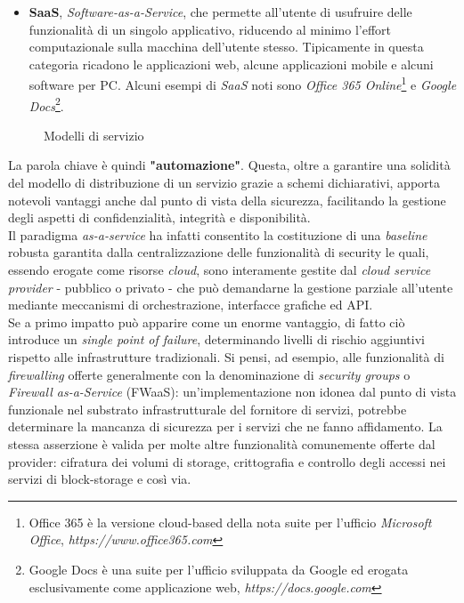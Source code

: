 \documentclass[../main.tex]{subfiles}
\begin{document}
\begin{itemize}
    \item \textbf{SaaS}, \textit{Software-as-a-Service}, che permette all'utente di usufruire delle funzionalità di un singolo applicativo, riducendo al minimo l'effort computazionale sulla macchina dell'utente stesso. Tipicamente in questa categoria ricadono le applicazioni web, alcune applicazioni mobile e alcuni software per PC. Alcuni esempi di \textit{SaaS} noti sono \textit{Office 365 Online}\footnote{Office 365 è la versione cloud-based della nota suite per l'ufficio \textit{Microsoft Office}, \textit{https://www.office365.com}} e \textit{Google Docs}\footnote{Google Docs è una suite per l'ufficio sviluppata da Google ed erogata esclusivamente come applicazione web, \textit{https://docs.google.com}}.
\end{itemize}
\begin{figure}[H]
\centering
{}
\caption{Modelli di servizio}\label{fig:modelliservizio}
\end{figure}




La parola chiave è quindi \textbf{"automazione"}. Questa, oltre a garantire una solidità del modello di distribuzione di un servizio grazie a schemi dichiarativi, apporta notevoli vantaggi anche dal punto di vista della sicurezza, facilitando la gestione degli aspetti di confidenzialità, integrità e disponibilità.
\\Il paradigma \textit{as-a-service} ha infatti consentito la costituzione di una \textit{baseline} robusta garantita dalla centralizzazione delle funzionalità di security le quali, essendo erogate come risorse \textit{cloud}, sono interamente gestite dal \textit{cloud service provider} - pubblico o privato - che può demandarne la gestione parziale all'utente mediante meccanismi di orchestrazione, interfacce grafiche ed API.
\\Se a primo impatto può apparire come un enorme vantaggio, di fatto ciò introduce un \textit{single point of failure}, determinando livelli di rischio aggiuntivi rispetto alle infrastrutture tradizionali. Si pensi, ad esempio, alle funzionalità di \textit{firewalling} offerte generalmente con la denominazione di \textit{security groups} o \textit{Firewall as-a-Service} (FWaaS): un'implementazione non idonea dal punto di vista funzionale nel substrato infrastrutturale del fornitore di servizi, potrebbe determinare la mancanza di sicurezza per i servizi che ne fanno affidamento.
La stessa asserzione è valida per molte altre funzionalità comunemente offerte dal provider: cifratura dei volumi di storage, crittografia e controllo degli accessi nei servizi di block-storage e così via.
\end{document}
